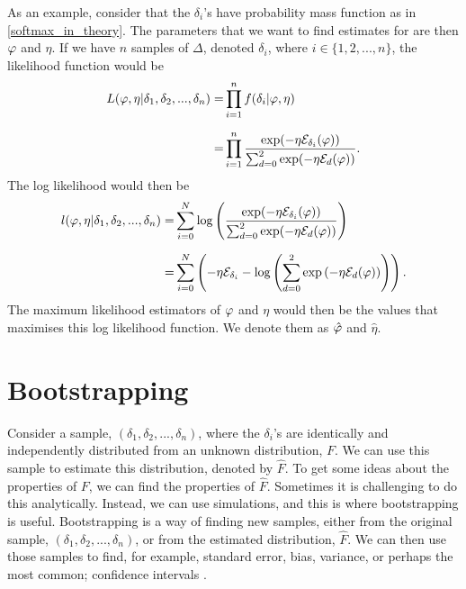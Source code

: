 As an example, consider that the $\delta_i$'s have probability mass function as in \eqref{softmax_in_theory}. The parameters that we want to find estimates for are then $\varphi$ and $\eta$. If we have $n$ samples of $\Delta$, denoted $\delta_i$, where $i \in \{1,2,...,n\}$,
the likelihood function would be
\begin{equation*}
    \begin{aligned}
        L(\varphi,\eta|\delta_1,\delta_2,...,\delta_n) 
        =& \prod_{i=1}^{n} f(\delta_i|\varphi,\eta)\\[6pt]
        =& \prod_{i=1}^{n}
        \frac{\text{exp}(- \eta \mathcal{E}_{\delta_i}(\varphi))}{\sum_{d=0}^{2} \text{exp}(-\eta \mathcal{E}_{d}(\varphi))}.
    \end{aligned}
\end{equation*}
The log likelihood would then be
\begin{equation*}
    \begin{aligned}
        l(\varphi,\eta|\delta_1,\delta_2,...,\delta_n) =& \sum_{i=0}^N \text{log}\left( \frac{\text{exp}({-\eta \mathcal{E}_{\delta_{i}}(\varphi))}}
        {\sum_{d=0}^{2} \text{exp}(-\eta \mathcal{E}_{d}(\varphi))}\right) \\[6pt]
        =& \sum_{i=0}^N \left(
        -\eta \mathcal{E}_{\delta_{i}} 
        - \text{log} \left( \sum_{d=0}^{2} \text{exp} \left(-\eta \mathcal{E}_{d}(\varphi)\right) \right) \right).
    \end{aligned}
\end{equation*}
The maximum likelihood estimators of $\varphi$ and $\eta$ would then be the values that maximises this log likelihood function. We denote them as $\hat{\varphi}$ and $\hat{\eta}$.




\section{Bootstrapping}
\label{section_theory_bootstrap}
Consider a sample, $(\delta_1,\delta_2,...,\delta_n)$, where the $\delta_i$'s are identically and independently distributed from an unknown distribution, $F$. We can use this sample to estimate this distribution, denoted by $\hat{F}$. To get some ideas about the properties of $F$, we can find the properties of $\hat{F}$. Sometimes it is challenging to do this analytically. Instead, we can use simulations, and this is where bootstrapping is useful. Bootstrapping is a way of finding new samples, either from the original sample, $(\delta_1,\delta_2,...,\delta_n)$, or from the estimated distribution, $\hat{F}$. We can then use those samples to find, for example, standard error, bias, variance, or perhaps the most common; confidence intervals \citep{bootstrap}.


